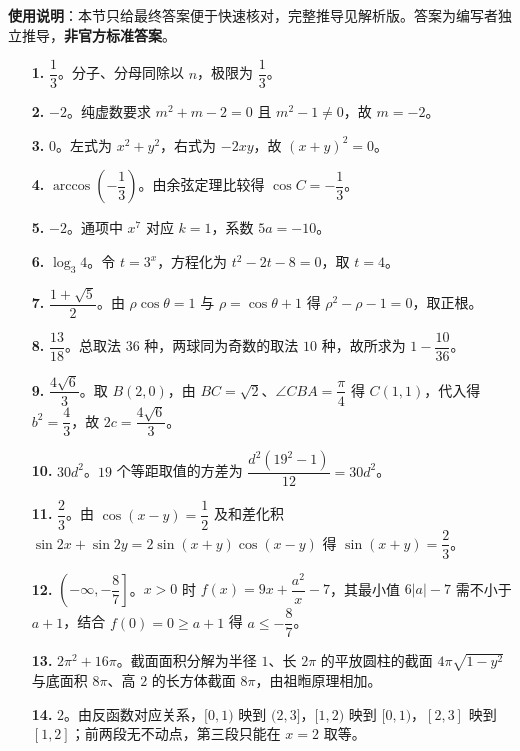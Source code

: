 
\begin{gknotice}
\textbf{使用说明}：本节只给最终答案便于快速核对，完整推导见解析版。答案为编写者独立推导，\textbf{非官方标准答案}。
\end{gknotice}

\begin{itemize}[leftmargin=2.6em]
  \item[\textbf{1.}] $\dfrac13$。分子、分母同除以 $n$，极限为 $\dfrac{1}{3}$。
  \item[\textbf{2.}] $-2$。纯虚数要求 $m^2+m-2=0$ 且 $m^2-1\neq0$，故 $m=-2$。
  \item[\textbf{3.}] $0$。左式为 $x^2+y^2$，右式为 $-2xy$，故 $(x+y)^2=0$。
  \item[\textbf{4.}] $\arccos\left(-\dfrac13\right)$。由余弦定理比较得 $\cos C=-\dfrac13$。
  \item[\textbf{5.}] $-2$。通项中 $x^7$ 对应 $k=1$，系数 $5a=-10$。
  \item[\textbf{6.}] $\log_3 4$。令 $t=3^x$，方程化为 $t^2-2t-8=0$，取 $t=4$。
  \item[\textbf{7.}] $\dfrac{1+\sqrt5}{2}$。由 $\rho\cos\theta=1$ 与 $\rho=\cos\theta+1$ 得 $\rho^2-\rho-1=0$，取正根。
  \item[\textbf{8.}] $\dfrac{13}{18}$。总取法 $36$ 种，两球同为奇数的取法 $10$ 种，故所求为 $1-\dfrac{10}{36}$。
  \item[\textbf{9.}] $\dfrac{4\sqrt6}{3}$。取 $B(2,0)$，由 $BC=\sqrt2$、$\angle CBA=\dfrac\pi4$ 得 $C(1,1)$，代入得 $b^2=\dfrac43$，故 $2c=\dfrac{4\sqrt6}{3}$。
  \item[\textbf{10.}] $30d^2$。$19$ 个等距取值的方差为 $\dfrac{d^2(19^2-1)}{12}=30d^2$。
  \item[\textbf{11.}] $\dfrac23$。由 $\cos(x-y)=\dfrac12$ 及和差化积 $\sin2x+\sin2y=2\sin(x+y)\cos(x-y)$ 得 $\sin(x+y)=\dfrac23$。
  \item[\textbf{12.}] $\left(-\infty,-\dfrac87\right]$。$x>0$ 时 $f(x)=9x+\dfrac{a^2}{x}-7$，其最小值 $6|a|-7$ 需不小于 $a+1$，结合 $f(0)=0\geqslant a+1$ 得 $a\leqslant-\dfrac87$。
  \item[\textbf{13.}] $2\pi^2+16\pi$。截面面积分解为半径 $1$、长 $2\pi$ 的平放圆柱的截面 $4\pi\sqrt{1-y^2}$ 与底面积 $8\pi$、高 $2$ 的长方体截面 $8\pi$，由祖暅原理相加。
  \item[\textbf{14.}] $2$。由反函数对应关系，$[0,1)$ 映到 $(2,3]$，$[1,2)$ 映到 $[0,1)$，$[2,3]$ 映到 $[1,2]$；前两段无不动点，第三段只能在 $x=2$ 取等。
\end{itemize}

